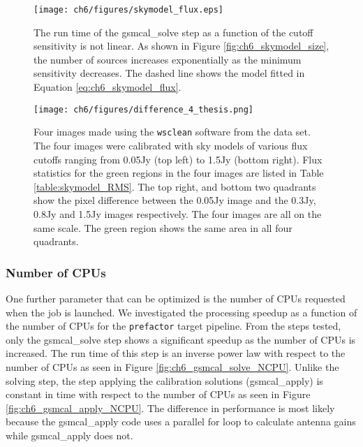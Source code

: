 \begin{figure}
    \texttt{[image: ch6/figures/skymodel\_flux.eps]}
      \caption[Run time vs cutoff sensitivity]{The run time of the {\selectfont gsmcal\_solve} step as a function of the cutoff sensitivity is not linear. As shown in Figure \ref{fig:ch6_skymodel_size}, the number of sources increases exponentially as the minimum sensitivity decreases. The dashed line shows the model fitted in Equation \ref{eq:ch6_skymodel_flux}. }
	\label{fig:ch6_skymodel_run_sens}
\end{figure}

\begin{figure*}
    \texttt{[image: ch6/figures/difference\_4\_thesis.png]}
      \caption[Comparison of data calibrated with four sky models]{Four images made using the \texttt{wsclean} software \citep{wsclean} from the data set\protect\footnotemark. The four images were calibrated with sky models of various flux cutoffs ranging from 0.05Jy (top left) to 1.5Jy (bottom right). Flux statistics for the green regions in the four images are listed in Table \ref{table:skymodel_RMS}. The top right, and bottom two quadrants show the pixel difference between the 0.05Jy image and the 0.3Jy, 0.8Jy and 1.5Jy images respectively. The four images are all on the same scale. The green region shows the same area in all four quadrants.  }
	\label{fig:ch6_skymodel_images}
\end{figure*}



\subsubsection{Number of CPUs}
One further parameter that can be optimized is the number of CPUs requested when the job is launched. We investigated the processing speedup as a function of the number of CPUs for the \texttt{prefactor} target pipeline. From the steps tested, only the {\selectfont gsmcal\_solve} step shows a significant speedup as the number of CPUs is increased. The run time of this step is an inverse power law with respect to the number of CPUs as seen in Figure \ref{fig:ch6_gsmcal_solve_NCPU}. Unlike the solving step, the step applying the calibration solutions ({\selectfont gsmcal\_apply}) is constant in time with respect to the number of CPUs as seen in Figure \ref{fig:ch6_gsmcal_apply_NCPU}. The difference in performance is most likely because the {\selectfont gsmcal\_apply} code uses a parallel for loop to calculate antenna gains while {\selectfont gsmcal\_apply} does not. 


